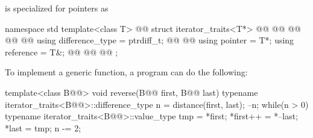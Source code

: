 \pnum
{} is specialized for pointers as

\begin{codeblock}
namespace std {
  template<class T>
    @@
  struct iterator_traits<T*> {
    @@  @@
    @@
    @@        @@
    using difference_type   = ptrdiff_t;
    @@        @@
    using pointer           = T*;
    using reference         = T&;
    @@
    @@  @@
  };
}
\end{codeblock}

\pnum
\begin{example}
To implement a generic
function, a \Cpp{} program can do the following:

\begin{codeblock}
template<class B@@>
void reverse(B@@ first, B@@ last) {
  typename iterator_traits<B@@>::difference_type n =
    distance(first, last);
  --n;
  while(n > 0) {
    typename iterator_traits<B@@>::value_type
     tmp = *first;
    *first++ = *--last;
    *last = tmp;
    n -= 2;
  }
}
\end{codeblock}
\end{example}

